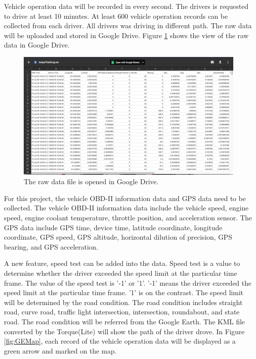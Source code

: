 Vehicle operation data will be recorded in every second. The drivers is requested to drive at least 10 minutes. At least 600 vehicle operation records can be collected from each driver. All drivers was driving in different path. The raw data will be uploaded and stored in Google Drive. Figure \ref{fig:GDfile} shows  the view of the raw data in Google Drive.

\begin{figure}[hbt!]\centering
\includegraphics[width=.75\textwidth]{image/GDfile}
\caption{The raw data file is opened in Google Drive.}
\label{fig:GDfile}
\end{figure}

For this project, the vehicle OBD-II information data and GPS data need to be collected. The vehicle OBD-II information data include the vehicle speed, engine speed, engine coolant temperature, throttle position, and acceleration sensor. The GPS data include GPS time, device time, latitude coordinate, longitude coordinate, GPS speed, GPS altitude, horizontal dilution of precision, GPS bearing, and GPS acceleration.

A new feature, speed test can be added into the data. Speed test is a value to determine whether the driver exceeded the speed limit at the particular time frame. The value of the speed test is '-1' or '1'. '-1' means the driver exceeded the speed limit at the particular time frame. '1' is on the contrast. The speed limit will be determined by the road condition. The road condition includes straight road, curve road, traffic light intersection, intersection, roundabout, and state road. The road condition will be referred from the Google Earth. The KML file converted by the Torque(Lite) will show the path of the driver drove. In Figure \ref{fig:GEMap}, each record of the vehicle operation data will be displayed as a green arrow and marked on the map. 


